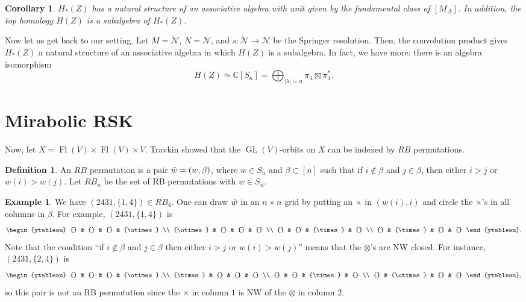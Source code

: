 \documentclass[12pt,a4paper]{article}
\def\Fl{\operatorname{Fl}}
\def\GL{\operatorname{GL}}
\def\FlVV{\Fl(V) \times \Fl(V)}
\theoremstyle{plain}
\newtheorem{cor}[thm]{Corollary}
\theoremstyle{definition}
\newtheorem{definition}[thm]{Definition}
\newtheorem{example}[thm]{Example}
\theoremstyle{remark}
\newcommand{\cN}{\mathcal{N}}
\newcommand{\CC}{\mathbb{C}}
\begin{document}
    \begin{cor}
        $H_*(Z)$ has a natural structure of an associative algebra with unit given by the fundamental class of $[M_{\Delta}]$. In addition, the top homology $H(Z)$ is a subalgebra of $H_*(Z)$.
    \end{cor}
    
    Now let us get back to our setting. Let $M = \tilde{\cN}$, $N = \cN$, and $s:\tilde{\cN} \rightarrow \cN$ be the Springer resolution. Then, the convolution product gives $H_*(Z)$ a natural structure of an associative algebra in which $H(Z)$ is a subalgebra. In fact, we have more: there is an algebra isomorphism
    \[
    H(Z) \simeq \CC[S_n] = \bigoplus_{|\lambda| = n}\pi_\lambda \boxtimes \pi^*_\lambda.
    \]

\section{Mirabolic RSK}\label{subsec:miraRSK}


    Now, let $X = \FlVV \times V$. Travkin \cite[Section 3.1]{travkin2009mirabolic} showed that the $\GL(V)$-orbits on $X$ can be indexed by $RB$ permutations.
    
    \begin{definition}\label{def:RB}
        An $RB$ permutation is a pair $\Tilde{w} = (w,\beta)$, where $w\in S_n$ and $\beta \subset [n]$ such that if $i\notin \beta$ and $j \in \beta$, then either $i > j$ or $w(i) > w(j)$. Let $RB_n$ be the set of RB permutations with $w\in S_n$.
    \end{definition}

    \begin{example}\label{ex:RB-perm}
        We have $(2431,\{1,4\}) \in RB_4$. One can draw $\Tilde{w}$ in an $n\times n$ grid by putting an $\times$ in $(w(i),i)$ and circle the $\times$'s in all columns in $\beta$. For example, $(2431,\{1,4\})$ is
        \[
        \begin{ytableau} 
            {} & {} & {} & {\otimes} \\
            {\otimes} & {} & {} & {} \\
            {} & {} & {\times} & {} \\
            {} & {\times} & {} & {}
        \end{ytableau}.
        \]
        Note that the condition ``if $i\notin \beta$ and $j \in \beta$ then either $i > j$ or $w(i) > w(j)$'' means that the $\otimes$'s are NW closed. For instance, $(2431,\{2,4\})$ is
        \[
        \begin{ytableau} 
            {} & {} & {} & {\otimes} \\
            {\times} & {} & {} & {} \\
            {} & {} & {\times} & {} \\
            {} & {\otimes} & {} & {}
        \end{ytableau},
        \]
        so this pair is not an RB permutation since the $\times$ in column $1$ is NW of the $\otimes$ in column $2$.
    \end{example}
\end{document}
